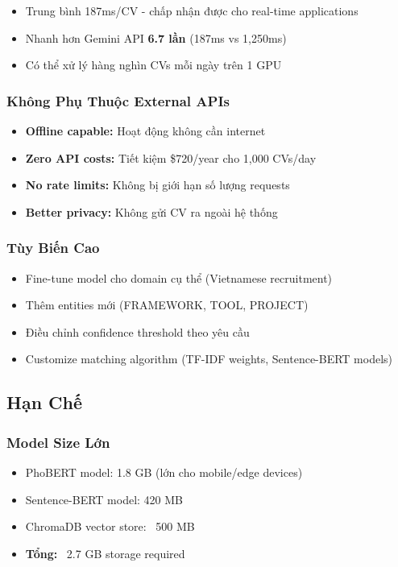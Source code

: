 \begin{itemize}
    \item Trung bình 187ms/CV - chấp nhận được cho real-time applications
    \item Nhanh hơn Gemini API \textbf{6.7 lần} (187ms vs 1,250ms)
    \item Có thể xử lý hàng nghìn CVs mỗi ngày trên 1 GPU
\end{itemize}

\subsubsection{Không Phụ Thuộc External APIs}

\begin{itemize}
    \item \textbf{Offline capable:} Hoạt động không cần internet
    \item \textbf{Zero API costs:} Tiết kiệm \$720/year cho 1,000 CVs/day
    \item \textbf{No rate limits:} Không bị giới hạn số lượng requests
    \item \textbf{Better privacy:} Không gửi CV ra ngoài hệ thống
\end{itemize}

\subsubsection{Tùy Biến Cao}

\begin{itemize}
    \item Fine-tune model cho domain cụ thể (Vietnamese recruitment)
    \item Thêm entities mới (FRAMEWORK, TOOL, PROJECT)
    \item Điều chỉnh confidence threshold theo yêu cầu
    \item Customize matching algorithm (TF-IDF weights, Sentence-BERT models)
\end{itemize}

\subsection{Hạn Chế}

\subsubsection{Model Size Lớn}

\begin{itemize}
    \item PhoBERT model: 1.8 GB (lớn cho mobile/edge devices)
    \item Sentence-BERT model: 420 MB
    \item ChromaDB vector store: ~500 MB
    \item \textbf{Tổng:} ~2.7 GB storage required
\end{itemize}

